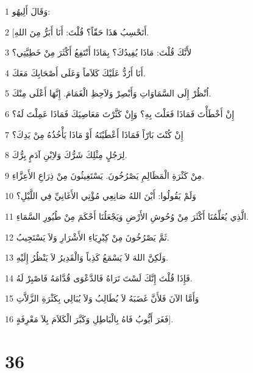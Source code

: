 \par 1 وَقَالَ أَلِيهُو:
\par 2 [أَتَحْسِبُ هَذَا حَقّاً؟ قُلْتَ: أَنَا أَبَرُّ مِنَ اللهِ.
\par 3 لأَنَّكَ قُلْتَ: مَاذَا يُفِيدُكَ؟ بِمَاذَا أَنْتَفِعُ أَكْثَرَ مِنْ خَطِيَّتِي؟
\par 4 أَنَا أَرُدُّ عَلَيْكَ كَلاَماً وَعَلَى أَصْحَابِكَ مَعَكَ.
\par 5 اُنْظُرْ إِلَى السَّمَاوَاتِ وَأَبْصِرْ وَلاَحِظِ الْغَمَامَ. إِنَّهَا أَعْلَى مِنْكَ.
\par 6 إِنْ أَخْطَأْتَ فَمَاذَا فَعَلْتَ بِهِ؟ وَإِنْ كَثَّرْتَ مَعَاصِيَكَ فَمَاذَا عَمِلْتَ لَهُ؟
\par 7 إِنْ كُنْتَ بَارّاً فَمَاذَا أَعْطَيْتَهُ أَوْ مَاذَا يَأْخُذُهُ مِنْ يَدِكَ؟
\par 8 لِرَجُلٍ مِثْلِكَ شَرُّكَ وَلاِبْنِ آدَمٍ بِرُّكَ.
\par 9 مِنْ كَثْرَةِ الْمَظَالِمِ يَصْرُخُونَ. يَسْتَغِيثُونَ مِنْ ذِرَاعِ الأَعِزَّاءِ.
\par 10 وَلَمْ يَقُولُوا: أَيْنَ اللهُ صَانِعِي مُؤْتِي الأَغَانِيِّ فِي اللَّيْلِ؟
\par 11 الَّذِي يُعَلِّمُنَا أَكْثَرَ مِنْ وُحُوشِ الأَرْضِ وَيَجْعَلُنَا أَحْكَمَ مِنْ طُيُورِ السَّمَاءِ.
\par 12 ثَمَّ يَصْرُخُونَ مِنْ كِبْرِيَاءِ الأَشْرَارِ وَلاَ يَسْتَجِيبُ.
\par 13 وَلَكِنَّ اللهَ لاَ يَسْمَعُ كَذِباً وَالْقَدِيرُ لاَ يَنْظُرُ إِلَيْهِ.
\par 14 فَإِذَا قُلْتَ إِنَّكَ لَسْتَ تَرَاهُ فَالدَّعْوَى قُدَّامَهُ فَاصْبِرْ لَهُ.
\par 15 وَأَمَّا الآنَ فَلأَنَّ غَضَبَهُ لاَ يُطَالِبُ وَلاَ يُبَالِي بِكَثْرَةِ الزَّلاَّتِ
\par 16 فَغَرَ أَيُّوبُ فَاهُ بِالْبَاطِلِ وَكَبَّرَ الْكَلاَمَ بِلاَ مَعْرِفَةٍ].

\chapter{36}

